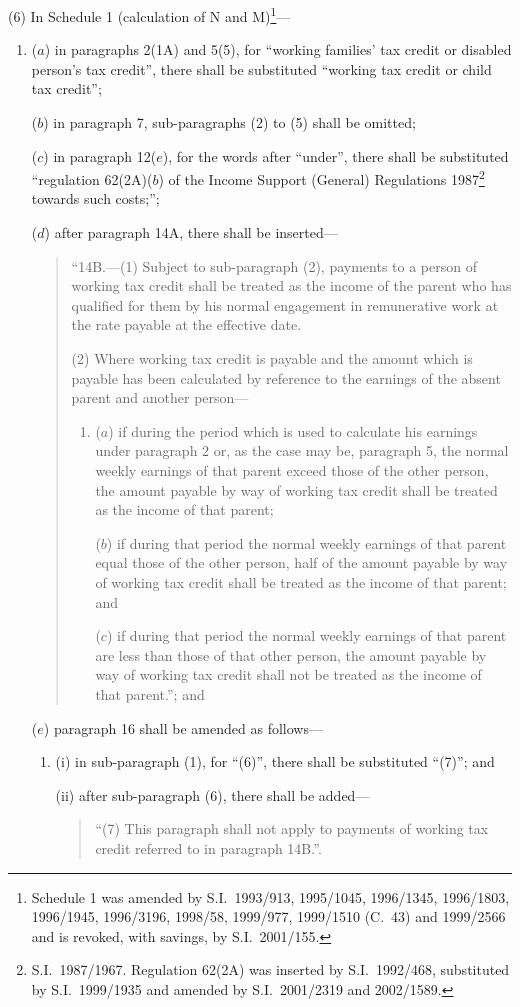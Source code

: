 \documentclass[12pt,a4paper]{article}
\begin{document}
(6) In Schedule 1 (calculation of N and M)\footnote{Schedule 1 was amended by S.I.\ 1993/913, 1995/1045, 1996/1345, 1996/1803, 1996/1945, 1996/3196, 1998/58, 1999/977, 1999/1510 (C.\ 43) and 1999/2566 and is revoked, with savings, by S.I.\ 2001/155.}—
\begin{enumerate}\item[]
($a$) in paragraphs 2(1A) and 5(5), for “working families' tax credit or disabled person’s tax credit”, there shall be substituted “working tax credit or child tax credit”;

($b$) in paragraph 7, sub-paragraphs (2) to (5) shall be omitted;

($c$) in paragraph 12($e$), for the words after “under”, there shall be substituted “regulation 62(2A)($b$)  of the Income Support (General) Regulations 1987\footnote{S.I.\ 1987/1967. Regulation 62(2A) was inserted by S.I.\ 1992/468, substituted by S.I.\ 1999/1935 and amended by S.I.\ 2001/2319 and 2002/1589.} towards such costs;”;

($d$) after paragraph 14A, there shall be inserted—
\begin{quotation}
“14B.---(1)  Subject to sub-paragraph (2), payments to a person of working tax credit shall be treated as the income of the parent who has qualified for them by his normal engagement in remunerative work at the rate payable at the effective date.

(2) Where working tax credit is payable and the amount which is payable has been calculated by reference to the earnings of the absent parent and another person—
\begin{enumerate}\item[]
($a$) if during the period which is used to calculate his earnings under paragraph 2 or, as the case may be, paragraph 5, the normal weekly earnings of that parent exceed those of the other person, the amount payable by way of working tax credit shall be treated as the income of that parent;

($b$) if during that period the normal weekly earnings of that parent equal those of the other person, half of the amount payable by way of working tax credit shall be treated as the income of that parent; and

($c$) if during that period the normal weekly earnings of that parent are less than those of that other person, the amount payable by way of working tax credit shall not be treated as the income of that parent.”; and
\end{enumerate}
\end{quotation}

($e$) paragraph 16 shall be amended as follows—
\begin{enumerate}\item[]
(i) in sub-paragraph (1), for “(6)”, there shall be substituted “(7)”; and

(ii) after sub-paragraph (6), there shall be added—
\begin{quotation}
“(7) This paragraph shall not apply to payments of working tax credit referred to in paragraph 14B.”.
\end{quotation}
\end{enumerate}
\end{enumerate}
\end{document}
